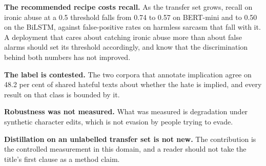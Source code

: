 \textbf{The recommended recipe costs recall.} As the transfer set grows, recall on ironic abuse at a
0.5 threshold falls from 0.74 to 0.57 on BERT-mini and to 0.50 on the BiLSTM, against false-positive
rates on harmless sarcasm that fall with it. A deployment that cares about catching ironic abuse
more than about false alarms should set its threshold accordingly, and know that the discrimination
behind both numbers has not improved.

\textbf{The label is contested.} The two corpora that annotate implication agree on 48.2 per cent of
shared hateful texts about whether the hate is implied, and every result on that class is bounded by
it.

\textbf{Robustness was not measured.} What was measured is degradation under synthetic character
edits, which is not evasion by people trying to evade.

\textbf{Distillation on an unlabelled transfer set is not new.} The contribution is the controlled
measurement in this domain, and a reader should not take the title's first clause as a method claim.

